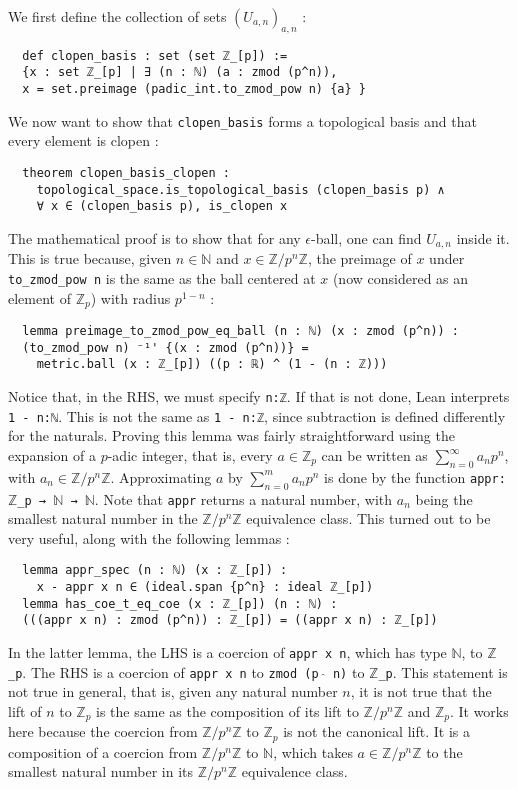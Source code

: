 \documentclass[a4paper,UKenglish,cleveref, autoref, thm-restate]{lipics-v2021}
\newcommand{\lean}[1]{\texttt{#1}\xspace} %
\begin{document}
We first define the collection of sets $(U_{a,n})_{a,n}$ :
\begin{lstlisting}
  def clopen_basis : set (set ℤ_[p]) := 
  {x : set ℤ_[p] | ∃ (n : ℕ) (a : zmod (p^n)),
  x = set.preimage (padic_int.to_zmod_pow n) {a} }
\end{lstlisting}

We now want to show that \lean{clopen\_basis} forms a topological basis and that every element is
clopen :
\begin{lstlisting}
  theorem clopen_basis_clopen : 
    topological_space.is_topological_basis (clopen_basis p) ∧
    ∀ x ∈ (clopen_basis p), is_clopen x
\end{lstlisting}
The mathematical proof is to show that for any $\epsilon$-ball, one can find $U_{a,n}$ inside it.
This is true because, given $n \in \mathbb{N}$ and $x \in \mathbb{Z} / p^n \mathbb{Z}$, the preimage of $x$ 
under \lean{to\_zmod\_pow n} is the same as the ball centered at $x$ (now considered as an element of $\mathbb{Z}_p$) with radius $p^{1 - n}$ :
\begin{lstlisting}
  lemma preimage_to_zmod_pow_eq_ball (n : ℕ) (x : zmod (p^n)) : 
  (to_zmod_pow n) ⁻¹' {(x : zmod (p^n))} = 
    metric.ball (x : ℤ_[p]) ((p : ℝ) ^ (1 - (n : ℤ)))
\end{lstlisting}

Notice that, in the RHS, we must specify \lean{n:ℤ}. If that is not done, Lean interprets \lean{1 - n:ℕ}. This is not the same as 
\lean{1 - n:ℤ}, since subtraction is defined differently for the naturals. 
Proving this lemma was fairly straightforward using the expansion of a $p$-adic integer, that is, every
$a \in \mathbb{Z}_p$ can be written as $\sum_{n = 0}^{\infty} a_n p^n$, with $a_n \in \mathbb{Z}/p^n \mathbb{Z}$.
Approximating $a$ by $\sum_{n = 0}^{m} a_n p^n$ is done by the function \lean{appr:$\mathbb{Z}$\_p → $\mathbb{N}$ → $\mathbb{N}$}.
Note that \lean{appr} returns a natural number, with $a_n$ being the smallest natural number in the
$\mathbb{Z}/p^n \mathbb{Z}$ equivalence class. This turned out to be very useful, along with the
following lemmas :

\begin{lstlisting}
  lemma appr_spec (n : ℕ) (x : ℤ_[p]) :  
    x - appr x n ∈ (ideal.span {p^n} : ideal ℤ_[p])
  lemma has_coe_t_eq_coe (x : ℤ_[p]) (n : ℕ) :
  (((appr x n) : zmod (p^n)) : ℤ_[p]) = ((appr x n) : ℤ_[p])
\end{lstlisting}

In the latter lemma, the LHS is a coercion of \lean{appr x n}, which has type \lean{$\mathbb{N}$}, to \lean{$\mathbb{Z}$\_p}. 
The RHS is a coercion of \lean{appr x n} to \lean{zmod (p $\hat{}$ n)} to \lean{$\mathbb{Z}$\_p}. 
This statement is not true in general, that is, given any natural number $n$, it is not true that the lift of $n$ to $\mathbb{Z}_p$ 
is the same as the composition of its lift to $\mathbb{Z}/p^n \mathbb{Z}$ and $\mathbb{Z}_p$. 
It works here because the coercion from $\mathbb{Z}/p^n \mathbb{Z}$ to $\mathbb{Z}_p$ is not the canonical lift.
It is a composition of a coercion from $\mathbb{Z}/p^n \mathbb{Z}$ to $\mathbb{N}$, which takes
$a \in \mathbb{Z}/p^n \mathbb{Z}$ to the smallest natural number in its
$\mathbb{Z}/p^n \mathbb{Z}$ equivalence class. 
\end{document}

